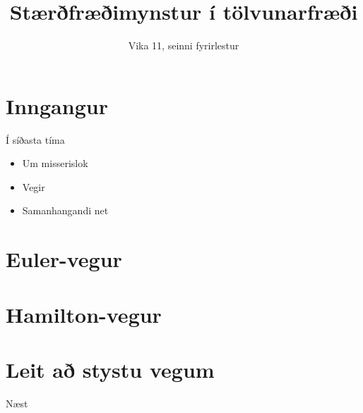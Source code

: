 \documentclass{beamer}
\title{Stærðfræðimynstur í tölvunarfræði}
\subtitle{Vika 11, seinni fyrirlestur}
\begin{document}
\begin{frame}
\titlepage
\end{frame}


\section{Inngangur}

\begin{frame}{Í síðasta tíma}
\begin{itemize}
 \item Um misserislok
 \item Vegir 
 \item Samanhangandi net
\end{itemize}
\end{frame}

\section{Euler-vegur}

\section{Hamilton-vegur}

\section{Leit að stystu vegum}

\begin{frame}{Næst}
\end{frame}
\end{document}
